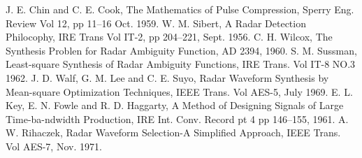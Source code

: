 \begin{references}
     J. E. Chin and C. E. Cook, The Mathematics of Pulse Compression, Sperry Eng. Review Vol 12, pp 11--16 Oct. 1959.
     W. M. Sibert, A Radar Detection Philocophy, IRE Trans Vol IT-2, pp 204--221, Sept. 1956.
     C. H. Wilcox, The Synthesis Problen for Radar Ambiguity Function, AD 2394, 1960.
     S. M. Sussman, Least-square Synthesis of Radar Ambiguity Functions, IRE Trans. Vol IT-8 NO.3 1962.
     J. D. Walf, G. M. Lee and C. E. Suyo, Radar Waveform Synthesis by Mean-square Optimization Techniques, IEEE Trans. Vol AES-5, July 1969.
     E. L. Key, E. N. Fowle and R. D. Haggarty, A Method of Designing Signals of Large Time-ba-ndwidth Production, IRE Int. Conv. Record pt 4 pp 146--155, 1961.
     A. W. Rihaczek, Radar Waveform Selection-A Simplified Approach, IEEE Trans. Vol AES-7, Nov. 1971.
\end{references}